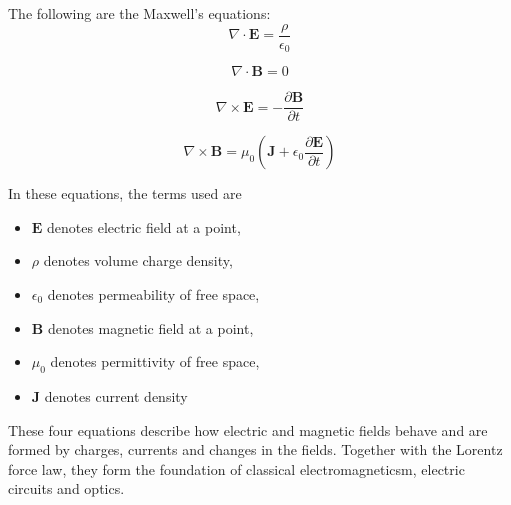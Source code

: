 The following are the Maxwell's equations:
\begin{equation}
\nabla \cdot \mathbf{E} = \frac{\rho}{\epsilon_0}
\end{equation}

\begin{equation}
\nabla \cdot \mathbf{B} = 0
\end{equation}

\begin{equation}
\nabla \times \mathbf{E} = - \frac{\partial \mathbf{B}}{\partial t}
\end{equation}

\begin{equation}
\nabla \times \mathbf{B} = \mu_0 (\mathbf{J} + \epsilon_0 \frac{\partial \mathbf{E}}{\partial t})
\end{equation}

In these equations, the terms used are
\begin{itemize}
  \item $\mathbf{E}$ denotes electric field at a point,
  \item $\rho$ denotes volume charge density,
  \item $\epsilon_0$ denotes permeability of free space,
  \item $\mathbf{B}$ denotes magnetic field at a point,
  \item $\mu_0$ denotes permittivity of free space,
  \item $\mathbf{J}$ denotes current density
\end{itemize}

These four equations describe how electric and magnetic fields behave 
and are formed by charges, currents and changes 
in the fields. Together with the Lorentz force law, 
they form the foundation of classical electromagneticsm, electric circuits 
and optics.

